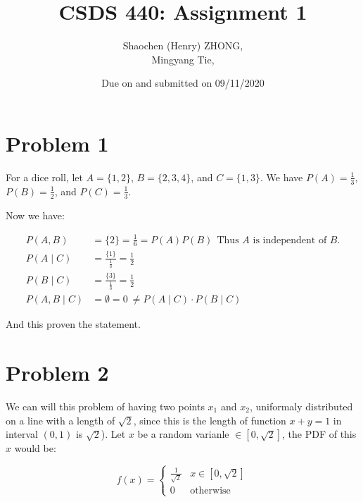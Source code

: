 \documentclass[12pt]{article}
\begin{document}
\title{\textbf{CSDS 440: Assignment 1}}

\author{Shaochen (Henry) ZHONG,  \\ Mingyang Tie, }
\date{Due on and submitted on 09/11/2020}
\maketitle


\section{Problem 1}

For a dice roll, let $A = \{1, 2\}$, $B = \{2, 3, 4\}$, and $C = \{1, 3\}$. We have  $P(A) = \frac{1}{3}$, $P(B) = \frac{1}{2}$, and $P(C) = \frac{1}{3}$.

Now we have:

\begin{align*}
    P(A, B) &= \{2\} = \frac{1}{6} = P(A)P(B) \ \ \text{Thus $A$ is independent of $B$.} \\
    P(A \mid C) &= \frac{ \{1\} }{\frac{1}{3}} = \frac{1}{2} \\
    P(B \mid C) &= \frac{ \{3\} }{\frac{1}{3}} = \frac{1}{2} \\
    P(A, B \mid C) &= \emptyset = 0 \ \neq P(A \mid C) \cdot P(B \mid C)
\end{align*}

And this proven the statement.

\section{Problem 2}

We can will this problem of having two points $x_1$ and $x_2$, uniformaly distributed on a line with a length of $\sqrt{2}$, since this is the length of function $x+y = 1$ in interval $(0, 1)$ is $\sqrt{2}$). Let $x$ be a random varianle $\in[0, \sqrt{2}]$, the PDF of this $x$ would be:

\[ f(x) = \begin{cases}
      \frac{1}{\sqrt{2}} & x \in [0, \sqrt{2}]\\
      0 & \text{otherwise}
   \end{cases}
\]
\end{document}
